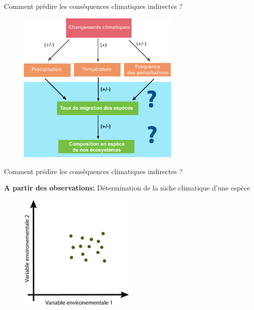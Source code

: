 \documentclass{eecslides}
\begin{document}
	\begin{frame}[t]{Comment prédire les conséquences climatiques indirectes ?}

		\begin{figure}
			\vspace{-0.5cm}
			\includegraphics[width=0.7\textwidth]{CCscheme.png} 
		\end{figure}  
	\end{frame}

	\begin{frame}[t]{Comment prédire les conséquences climatiques indirectes ?}

		\textbf{A partir des observations:} Détermination de la niche climatique d'une espèce

		\begin{figure}
			\vspace{-0.5cm}
			\includegraphics[width=0.5\textwidth]{Niche1.png} 
		\end{figure}    
	
	\end{frame}
\end{document}
